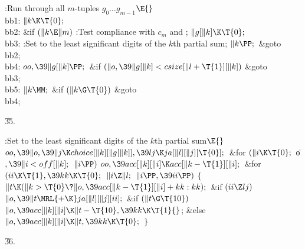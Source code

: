 \B{}:Run through all $m$-tuples $g_0\ldots g_{m-1}$\X${}\E{}$\6
\4\\{bb1}:\5
${}\|k\K\T{0};{}$\6
\4\\{bb2}:\5
\&{if} ${}(\|k\E\|m){}$\1\5
:Test compliance with $c_m$ and \X;\2\6
${}\|g[\|k]\K\T{0};{}$\6
\4\\{bb3}:\5
:Set  to the least significant digits of the $k$th partial
sum\X;\6
${}\|k\PP;{}$\6
\&{goto} \\{bb2};\6
\4\\{bb4}:\5
${}\\{oo},\39\|g[\|k]\PP;{}$\6
\&{if} ${}(\|o,\39\|g[\|k]<\\{csize}[\|l+\T{1}][\|k]){}$\1\5
\&{goto} \\{bb3};\2\6
\4\\{bb5}:\5
${}\|k\MM;{}$\6
\&{if} ${}(\|k\G\T{0}){}$\1\5
\&{goto} \\{bb4};\2\par
\U35.\fi

\B{}:Set  to the least significant digits of the $k$th
partial sum\X${}\E{}$\6
$\\{oo},\39\|o,\39\|j\K\\{choice}[\|k][\|g[\|k]],\39\\{lj}\K\\{ja}[\|l][\|j][%
\T{0}];{}$\6
\&{for} ${}(\|i\K\T{0};{}$ \|o${},\39\|i<\\{off}[\|k];{}$ ${}\|i\PP){}$\1\5
${}\\{oo},\39\\{acc}[\|k][\|i]\K\\{acc}[\|k-\T{1}][\|i];{}$\2\6
\&{for} ${}(\\{ii}\K\T{1},\39\\{kk}\K\T{0};{}$ ${}\|i\Z\|l;{}$ ${}\|i\PP,\39%
\\{ii}\PP){}$\5
${}\{{}$\1\6
${}\|t\K(\|k>\T{0}\?\|o,\39\\{acc}[\|k-\T{1}][\|i]+\\{kk}:\\{kk});{}$\6
\&{if} ${}(\\{ii}\Z\\{lj}){}$\1\5
${}\|o,\39\|t\MRL{+{\K}}\\{ja}[\|l][\|j][\\{ii}];{}$\2\6
\&{if} ${}(\|t\G\T{10}){}$\1\5
${}\|o,\39\\{acc}[\|k][\|i]\K\|t-\T{10},\39\\{kk}\K\T{1}{}$;\5
\2\&{else}\1\5
${}\|o,\39\\{acc}[\|k][\|i]\K\|t,\39\\{kk}\K\T{0};{}$\2\6
\4${}\}{}$\2\par
\U36.\fi

